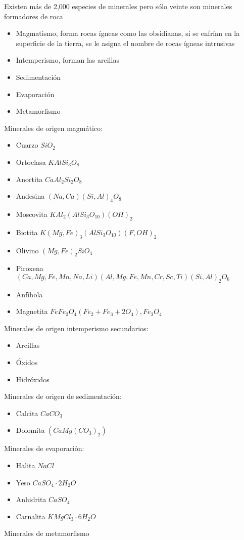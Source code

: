 Existen más de 2,000 especies de minerales pero sólo veinte son minerales formadores de roca

\begin{itemize}
    \item Magmatismo, forma rocas ígneas como las obsidianas, si se enfrían en la superficie de la tierra, se le asigna el nombre de rocas ígneas intrusivas
    \item Intemperismo, forman las arcillas
    \item Sedimentación 
    \item Evaporación
    \item Metamorfismo
\end{itemize}

Minerales de origen magmático:
\begin{itemize}
    \item Cuarzo $SiO_2$
    \item Ortoclasa $KAlSi_3O_8$
    \item Anortita $CaAl_2Si_2O_8$
    \item Andesina $(Na,Ca)(Si,Al)_4O_8$
    \item Moscovita $KAl_2(AlSi_3O_{10})(OH)_2$
    \item Biotita $ K(Mg,Fe)_3(AlSi_3O_{10})(F,OH)_2$
    \item Olivino $(Mg,Fe)_2SiO_4$
    \item Piroxena $(Ca,Mg,Fe,Mn,Na,Li)(Al, Mg, Fe, Mn,Cr,Sc,Ti)(Si, Al)_2O_6$
    \item Anfíbola 
    \item Magnetita $FeFe_2O_4 (Fe_2+Fe_3+2 O_4), Fe_3O_4$
\end{itemize}

Minerales de origen intemperismo secundarios:
\begin{itemize}
    \item Arcillas
    \item Óxidos
    \item Hidróxidos
\end{itemize}
Minerales de origen de sedimentación:
\begin{itemize}
    \item Calcita $CaCO_3$
    \item Dolomita $(CaMg(CO_3)_2)$
\end{itemize}
Minerales de evaporación:
\begin{itemize}
    \item Halita $NaCl$
    \item Yeso $ CaSO_4\cdot 2H_2O$
    \item Anhidrita $CaSO_4$
    \item Carnalita $ KMgCl_3\cdot 6H_2O$
\end{itemize}
Minerales de metamorfismo

